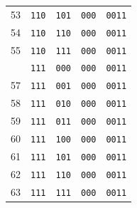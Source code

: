 \begin{minipage}[t]{0.48\textwidth}
\begin{tabular}{@{}r c c c c@{}}
53 & \texttt{110} & \texttt{101} & \texttt{000} & \texttt{0011} \\
54 & \texttt{110} & \texttt{110} & \texttt{000} & \texttt{0011} \\
55 & \texttt{110} & \texttt{111} & \texttt{000} & \texttt{0011} \\
\addlinespace[2pt]
56 & \texttt{111} & \texttt{000} & \texttt{000} & \texttt{0011} \\
57 & \texttt{111} & \texttt{001} & \texttt{000} & \texttt{0011} \\
58 & \texttt{111} & \texttt{010} & \texttt{000} & \texttt{0011} \\
59 & \texttt{111} & \texttt{011} & \texttt{000} & \texttt{0011} \\
60 & \texttt{111} & \texttt{100} & \texttt{000} & \texttt{0011} \\
61 & \texttt{111} & \texttt{101} & \texttt{000} & \texttt{0011} \\
62 & \texttt{111} & \texttt{110} & \texttt{000} & \texttt{0011} \\
63 & \texttt{111} & \texttt{111} & \texttt{000} & \texttt{0011} \\
\bottomrule
\end{tabular}
\end{minipage}